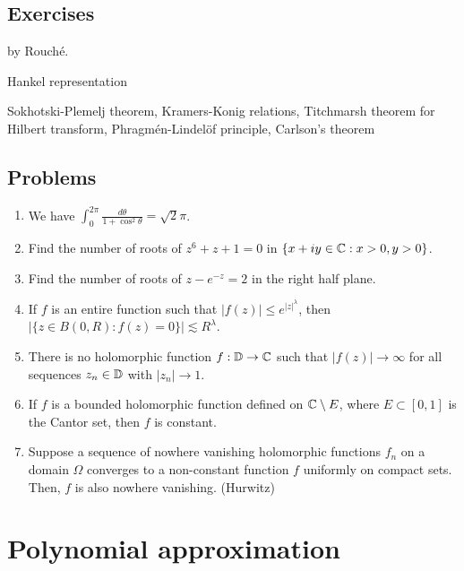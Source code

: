 \documentclass{../../large}
\begin{document}
\section*{Exercises}
\begin{prb}
by Rouch\'e.
\end{prb}
\begin{prb}
\end{prb}
\begin{prb}
Hankel representation
\end{prb}
\begin{prb}
\end{prb}

Sokhotski-Plemelj theorem,
Kramers-Konig relations,
Titchmarsh theorem for Hilbert transform,
Phragm\'en-Lindel\"of principle,
Carlson's theorem

\section*{Problems}
\begin{enumerate}
\item We have $\int_0^{2\pi}\frac{d\theta}{1+\cos^2\theta}=\sqrt2\pi$.
\item Find the number of roots of $z^6+z+1=0$ in $\{x+iy\in\mathbb{C}:x>0,y>0\}$.
\item Find the number of roots of $z-e^{-z}=2$ in the right half plane.
\item If $f$ is an entire function such that $|f(z)|\le e^{|z|^\lambda}$, then $|\{z\in B(0,R):f(z)=0\}|\lesssim R^\lambda$.
\item There is no holomorphic function $f:\mathbb{D}\to\mathbb{C}$ such that $|f(z)|\to\infty$ for all sequences $z_n\in\mathbb{D}$ with $|z_n|\to1$.
\item If $f$ is a bounded holomorphic function defined on $\mathbb{C}\setminus E$, where $E\subset[0,1]$ is the Cantor set, then $f$ is constant.
\item Suppose a sequence of nowhere vanishing holomorphic functions $f_n$ on a domain $\Omega$ converges to a non-constant function $f$ uniformly on compact sets.
Then, $f$ is also nowhere vanishing. (Hurwitz)
\end{enumerate}




\chapter{Polynomial approximation}
\end{document}
